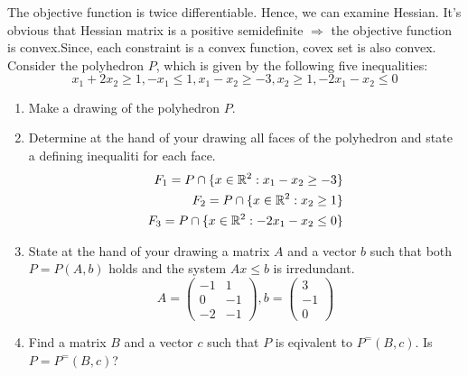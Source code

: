 \documentclass{homework}
\begin{document}
The objective function is twice differentiable. Hence, we can examine Hessian. It's obvious that Hessian matrix is a positive semidefinite $\Rightarrow$ the objective function is convex.Since, each constraint is a convex function, covex set is also convex.
\exercise
Consider the polyhedron $P$, which is given by the following five inequalities: \[x_1 + 2x_2\geq 1, -x_1\leq 1, x_1 - x_2 \geq -3, x_2\geq 1, -2x_1-x_2\leq0\]
\begin{enumerate}[label=(\alph*)]
	\item Make a drawing of the polyhedron $P$.
	\begin{center}
	\end{center}
	\item Determine at the hand of your drawing all faces of the polyhedron and state a defining inequaliti for each face.
	\begin{align*}
	F_1 = P\cap\{x\in \mathbb R^2: x_1 - x_2 \geq -3\} \\
	F_2 = P\cap\{x\in \mathbb R^2: x_2 \geq 1\} \\
	F_3 = P\cap\{x\in \mathbb R^2: -2x_1 - x_2 \leq 0\}
	\end{align*}
	\item State at the hand of your drawing a matrix $A$ and a vector $b$ such that both $P=P(A,b)$ holds and the system $Ax\leq b$ is irredundant.
	\[ A =
	\begin{pmatrix}
	-1 & 1\\
	0 & -1 \\
	-2 & -1
	\end{pmatrix}
	, b =
	\begin{pmatrix}
	3\\
	-1\\
	0
	\end{pmatrix}
	\]
	\item Find a matrix $B$ and a vector $c$ such that $P$ is eqivalent to $P^=(B,c)$. Is $P=P^=(B,c)$?


\end{enumerate}
\end{document}
